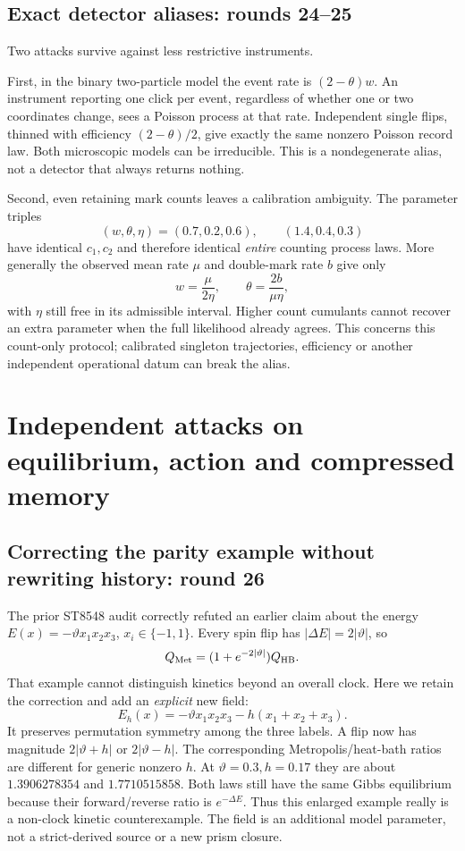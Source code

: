 \documentclass[11pt,a4paper]{article}
\begin{document}
\subsection{Exact detector aliases: rounds 24--25}

Two attacks survive against less restrictive instruments.

First, in the binary two-particle model the event rate is $(2-\theta)w$.
An instrument reporting one click per event, regardless of whether one or
two coordinates change, sees a Poisson process at that rate. Independent
single flips, thinned with efficiency $(2-\theta)/2$, give exactly the same
nonzero Poisson record law. Both microscopic models can be irreducible.
This is a nondegenerate alias, not a detector that always returns nothing.

Second, even retaining mark counts leaves a calibration ambiguity. The
parameter triples
\[
 (w,\theta,\eta)=(0.7,0.2,0.6),\qquad(1.4,0.4,0.3)
\]
have identical $c_1,c_2$ and therefore identical \emph{entire} counting
process laws. More generally the observed mean rate $\mu$ and double-mark
rate $b$ give only
\[
 w=\frac{\mu}{2\eta},\qquad
 \theta=\frac{2b}{\mu\eta},
\]
with $\eta$ still free in its admissible interval. Higher count cumulants
cannot recover an extra parameter when the full likelihood already agrees.
This concerns this count-only protocol; calibrated singleton trajectories,
efficiency or another independent operational datum can break the alias.

\section{Independent attacks on equilibrium, action and compressed memory}
\label{sec:action}

\subsection{Correcting the parity example without rewriting history: round 26}

The prior ST8548 audit correctly refuted an earlier claim about the energy
$E(x)=-\vartheta x_1x_2x_3$, $x_i\in\{-1,1\}$. Every spin flip has
$|\Delta E|=2|\vartheta|$, so
\[
 Q_{\rm Met}=(1+e^{-2|\vartheta|})Q_{\rm HB}.
\]
That example cannot distinguish kinetics beyond an overall clock.
Here we retain the correction and add an \emph{explicit} new field:
\[
 E_h(x)=-\vartheta x_1x_2x_3-h(x_1+x_2+x_3).
\]
It preserves permutation symmetry among the three labels. A flip now has
magnitude $2|\vartheta+h|$ or $2|\vartheta-h|$. The corresponding
Metropolis/heat-bath ratios are different for generic nonzero $h$.
At $\vartheta=0.3,h=0.17$ they are about $1.3906278354$ and
$1.7710515858$. Both laws still have the same Gibbs equilibrium because
their forward/reverse ratio is $e^{-\Delta E}$. Thus this enlarged example
really is a non-clock kinetic counterexample. The field is an additional
model parameter, not a strict-derived source or a new prism closure.
\end{document}
